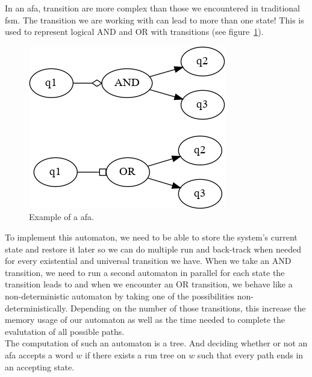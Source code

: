 \documentclass[12pt]{article}
\theoremstyle{definition}
\theoremstyle{definition}
\theoremstyle{remark}
\begin{document}
In an \gls{afa}, transition are more complex than those we encountered in traditional \gls{fsm}. The transition we are working with can lead to more than one state! This is used to represent logical AND and OR with transitions (see figure~\ref{afa}).\\

\begin{figure}
    \centering
    \includegraphics[scale=0.8]{graph/afa.png}
    \caption{Example of a \gls{afa}.}
    \label{afa}
\end{figure}

To implement this automaton, we need to be able to store the system's current state and restore it later so we can do multiple run and back-track when needed for every existential and universal transition we have. When we take an AND transition, we need to run a second automaton in parallel for each state the transition leads to and when we encounter an OR transition, we behave like a non-deterministic automaton by taking one of the possibilities non-deterministically. Depending on the number of those transitions, this increase the memory usage of our automaton as well as the time needed to complete the evalutation of all possible paths.\\

The computation of such an automaton is a tree. And deciding whether or not an \gls{afa} accepts a word $w$ if there exists a run tree on $w$ such that every path ends in an accepting state.~\cite{AFA:2017}\\
\end{document}
